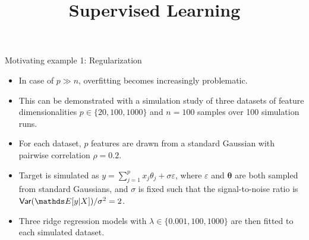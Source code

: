 \documentclass[11pt,compress,t,notes=noshow, xcolor=table]{beamer}
\title{Supervised Learning}
\date{}
\begin{document}

  \begin{vbframe}{Motivating example 1: Regularization}
  \begin{itemize}
  \setlength{\itemsep}{1.15em}
    \item In case of $p \gg n$,  overfitting becomes increasingly problematic.
    \item This can be demonstrated with a simulation study of three datasets of feature dimensionalities $p \in \{ 20, 100, 1000 \}$ and $n=100$ samples over 100 simulation runs.
    \item For each dataset, $p$ features are drawn from a standard Gaussian with pairwise correlation $\rho=0.2$.
      \item Target is simulated as
    $ y = \sum_{j=1}^p x_j \theta_j + \sigma\varepsilon $, where $\varepsilon$ and $\bm{\theta}$ are both sampled from standard Gaussians, and $\sigma$ is fixed such that the signal-to-noise ratio is $\var (\E[y|X]) / \sigma^2 = 2$.
    \item Three ridge regression models with $\lambda \in \{ 0.001, 100, 1000 \}$ are then fitted to each simulated dataset.
  \end{itemize}
  
  \framebreak
  

\end{vbframe}
\end{document}
